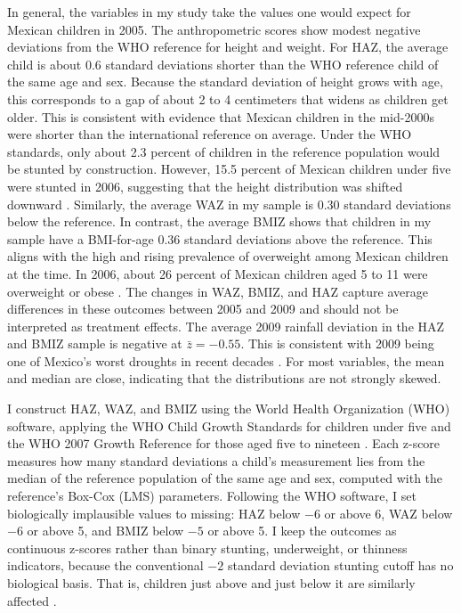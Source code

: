 \documentclass[12pt]{article}
\begin{document}
In general, the variables in my study take the values one would expect for Mexican children in 2005. The anthropometric scores show modest negative deviations from the WHO reference for height and weight. For HAZ, the average child is about 0.6 standard deviations shorter than the WHO reference child of the same age and sex. Because the standard deviation of height grows with age, this corresponds to a gap of about 2 to 4 centimeters that widens as children get older. This is consistent with evidence that Mexican children in the mid-2000s were shorter than the international reference on average. Under the WHO standards, only about 2.3 percent of children in the reference population would be stunted by construction. However, 15.5 percent of Mexican children under five were stunted in 2006, suggesting that the height distribution was shifted downward \parencite{gonzalez-decossioChildMalnutritionMexico2009}. Similarly, the average WAZ in my sample is 0.30 standard deviations below the reference. In contrast, the average BMIZ shows that children in my sample have a BMI-for-age 0.36 standard deviations above the reference. This aligns with the high and rising prevalence of overweight among Mexican children at the time. In 2006, about 26 percent of Mexican children aged 5 to 11 were overweight or obese \parencite{shamah-levyResultadosNutricionENSANUT2007}. The changes in WAZ, BMIZ, and HAZ capture average differences in these outcomes between 2005 and 2009 and should not be interpreted as treatment effects. The average 2009 rainfall deviation in the HAZ and BMIZ sample is negative at $\bar{z} = -0.55$. This is consistent with 2009 being one of Mexico's worst droughts in recent decades \parencite{davydova-belitskayaMexico2010}. For most variables, the mean and median are close, indicating that the distributions are not strongly skewed.

I construct HAZ, WAZ, and BMIZ using the World Health Organization (WHO) software, applying the WHO Child Growth Standards for children under five and the WHO 2007 Growth Reference for those aged five to nineteen \parencite{whomulticentregrowthreferencestudygroupWHOChildGrowth2006,deonisDevelopmentWHOGrowth2007}. Each z-score measures how many standard deviations a child's measurement lies from the median of the reference population of the same age and sex, computed with the reference's Box-Cox (LMS) parameters. Following the WHO software, I set biologically implausible values to missing: HAZ below $-6$ or above 6, WAZ below $-6$ or above 5, and BMIZ below $-5$ or above 5. I keep the outcomes as continuous z-scores rather than binary stunting, underweight, or thinness indicators, because the conventional $-2$ standard deviation stunting cutoff has no biological basis. That is, children just above and just below it are similarly affected \parencite{perumalUseMisuseStunting2018}.
\end{document}

